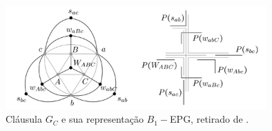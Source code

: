 \begin{figure}[htb]	
\center%
\includegraphics[width=10cm]{./img/resultante.png}
\caption{Cláusula $G_{C}$ e sua representação $B_{1}-$EPG, retirado de \cite{heldt2014}.}
\label{fig:resultante}
\end{figure}